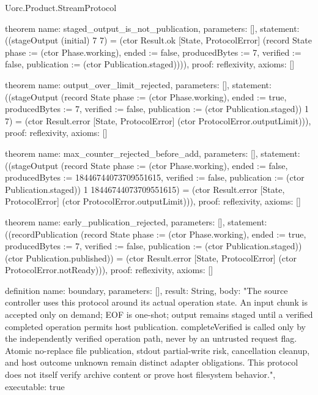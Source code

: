 \begin{lexlean}{Uorc.Product.StreamProtocol}
\begin{semanticmodule}
theorem{
  name: staged_output_is_not_publication,
  parameters: [],
  statement: ((stageOutput (initial) 7 7) = (ctor Result.ok [State, ProtocolError] (record State {phase := (ctor Phase.working), ended := false, producedBytes := 7, verified := false, publication := (ctor Publication.staged)}))),
  proof: reflexivity{},
  axioms: []
}

theorem{
  name: output_over_limit_rejected,
  parameters: [],
  statement: ((stageOutput (record State {phase := (ctor Phase.working), ended := true, producedBytes := 7, verified := false, publication := (ctor Publication.staged)}) 1 7) = (ctor Result.error [State, ProtocolError] (ctor ProtocolError.outputLimit))),
  proof: reflexivity{},
  axioms: []
}

theorem{
  name: max_counter_rejected_before_add,
  parameters: [],
  statement: ((stageOutput (record State {phase := (ctor Phase.working), ended := false, producedBytes := 18446744073709551615, verified := false, publication := (ctor Publication.staged)}) 1 18446744073709551615) = (ctor Result.error [State, ProtocolError] (ctor ProtocolError.outputLimit))),
  proof: reflexivity{},
  axioms: []
}

theorem{
  name: early_publication_rejected,
  parameters: [],
  statement: ((recordPublication (record State {phase := (ctor Phase.working), ended := true, producedBytes := 7, verified := false, publication := (ctor Publication.staged)}) (ctor Publication.published)) = (ctor Result.error [State, ProtocolError] (ctor ProtocolError.notReady))),
  proof: reflexivity{},
  axioms: []
}

definition{
  name: boundary,
  parameters: [],
  result: String,
  body: "The source controller uses this protocol around its actual operation state. An input chunk is accepted only on demand; EOF is one-shot; output remains staged until a verified completed operation permits host publication. completeVerified is called only by the independently verified operation path, never by an untrusted request flag. Atomic no-replace file publication, stdout partial-write risk, cancellation cleanup, and host outcome unknown remain distinct adapter obligations. This protocol does not itself verify archive content or prove host filesystem behavior.",
  executable: true
}
\end{semanticmodule}
\end{lexlean}
